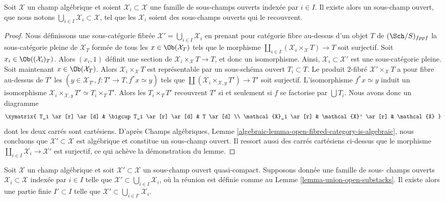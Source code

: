 \begin{lemma}
\label{lemma-union-open-substacks}
Soit $\mathcal X$ un champ algébrique et soient $\mathcal{X}_i \subset \mathcal X$
une famille de sous-champs ouverts indexée par $i \in I$. Il existe alors un
sous-champ ouvert, que nous notons
$\bigcup_{i\in I} \mathcal{X}_i \subset \mathcal X$, tel que
les $\mathcal{X}_i$ soient des sous-champs ouverts qui le recouvrent.
\end{lemma}

\begin{proof}
Nous définissons une sous-catégorie fibrée
$\mathcal{X}' = \bigcup_{i \in I} \mathcal{X}_i$
en prenant pour catégorie fibre au-dessus d'un objet $T$ de $(\Sch/S)_{fppf}$
la sous-catégorie pleine de $\mathcal{X}_T$ formée de tous les
$x \in \Ob(\mathcal{X}_T)$ tels que le morphisme
$\coprod_{i \in I} (\mathcal{X}_i \times_{\mathcal X} T) \to T$
soit surjectif. Soit $x_i \in \Ob((\mathcal{X}_i)_T)$.
Alors $(x_i, 1)$ définit une section de
$\mathcal{X}_i \times_{\mathcal X} T \to T$, et donc un isomorphisme. Ainsi,
$\mathcal{X}_i \subset \mathcal{X}'$ est une sous-catégorie pleine.
Soit maintenant $x \in \Ob(\mathcal{X}_T)$. Alors
$\mathcal{X}_i \times_{\mathcal X} T$ est représentable
par un sous-schéma ouvert $T_i \subset T$. Le produit $2$-fibré
$\mathcal{X}' \times_{\mathcal X} T$ a pour fibre au-dessus de $T'$ les
$(y \in \mathcal{X}_{T'}, f : T' \to T, f^*x \simeq y)$ tels que
$\coprod (\mathcal{X}_i \times_{\mathcal X, y} T') \to T'$ soit surjectif.
L'isomorphisme $f^*x \simeq y$ induit un isomorphisme
$\mathcal{X}_i \times_{\mathcal X, y} T' \simeq T_i \times_T T'$.
Alors les $T_i \times_T T'$ recouvrent $T'$ si et seulement si $f$ se factorise par
$\bigcup T_i$. Nous avons donc un diagramme
$$
\xymatrix{
T_i \ar[r] \ar[d] &
\bigcup T_i \ar[r] \ar[d] &
T \ar[d] \\
\mathcal{X}_i \ar[r] &
\mathcal{X}' \ar[r] &
\mathcal{X}
}
$$
dont les deux carrés sont cartésiens. D'après
Champs algébriques, Lemme \ref{algebraic-lemma-open-fibred-category-is-algebraic},
nous concluons que $\mathcal{X'} \subset \mathcal{X}$ est algébrique et constitue un
sous-champ ouvert. Il ressort aussi des carrés cartésiens ci-dessus que le
morphisme $\coprod_{i \in I} \mathcal{X}_i \to \mathcal{X}'$ est surjectif, ce
qui achève la démonstration du lemme.
\end{proof}

\begin{lemma}
\label{lemma-quasi-compact-finite-subcover}
Soit $\mathcal X$ un champ algébrique et soit $\mathcal X' \subset \mathcal X$
un sous-champ ouvert quasi-compact. Supposons donnée une famille de sous-
champs ouverts $\mathcal{X}_i \subset \mathcal X$ indexée par $i \in I$ telle
que $\mathcal{X}' \subset \bigcup_{i \in I} \mathcal{X}_i$,
où la réunion est définie comme au Lemme \ref{lemma-union-open-substacks}.
Il existe alors une partie finie $I' \subset I$ telle que
$\mathcal{X}' \subset \bigcup_{i \in I'} \mathcal{X}_i$.
\end{lemma}

